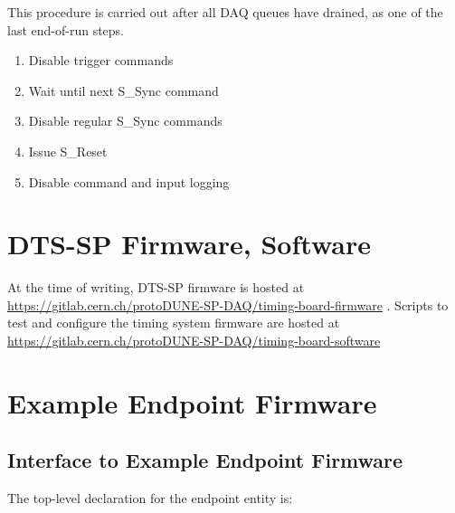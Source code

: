 \documentclass[a4paper,11pt]{article}
\begin{document}
This procedure is carried out after all DAQ queues have drained, as one of the last end-of-run steps.

\begin{enumerate} 
	\item Disable trigger commands
	\item Wait until next S\_Sync command
	\item Disable regular S\_Sync commands
	\item Issue S\_Reset
	\item Disable command and input logging
\end{enumerate}

\clearpage

\appendix

\section{DTS-SP Firmware, Software}

At the time of writing, DTS-SP firmware is hosted at \url{https://gitlab.cern.ch/protoDUNE-SP-DAQ/timing-board-firmware} . Scripts to test and configure the timing system firmware are hosted at \url{https://gitlab.cern.ch/protoDUNE-SP-DAQ/timing-board-software}



\section{Example Endpoint Firmware}

\subsection{Interface to Example Endpoint Firmware }

The top-level declaration for the endpoint entity is:
\end{document}
